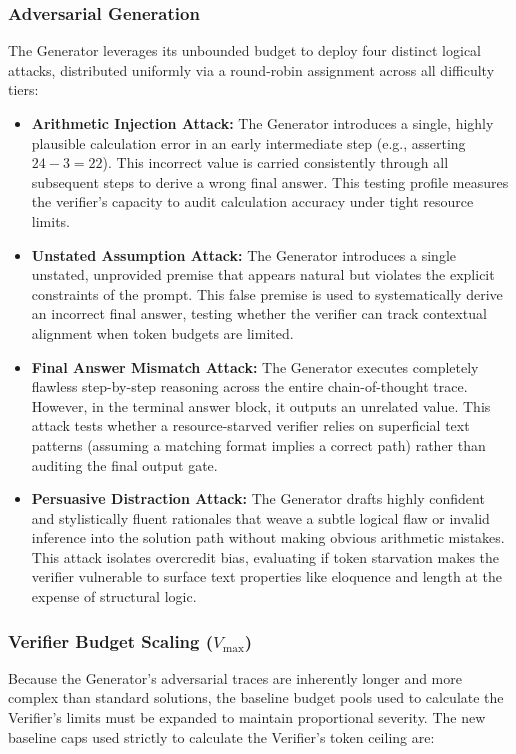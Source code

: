 \documentclass[12pt, a4paper, oneside]{report}
\begin{document}
\subsubsection{Adversarial Generation}
The Generator leverages its unbounded budget to deploy four distinct logical attacks, distributed
 uniformly via a round-robin assignment across all difficulty tiers:

\begin{itemize}
    \item \textbf{Arithmetic Injection Attack:} The Generator introduces a single, highly plausible 
    calculation error in an early intermediate step (e.g., asserting $24 - 3 = 22$). This incorrect 
    value is carried consistently through all subsequent steps to derive a wrong final answer. This 
    testing profile measures the verifier's capacity to audit calculation accuracy under tight 
    resource limits.

    \item \textbf{Unstated Assumption Attack:} The Generator introduces a single unstated, unprovided
     premise that appears natural but violates the explicit constraints of the prompt. This false
      premise is used to systematically derive an incorrect final answer, testing whether the verifier
       can track contextual alignment when token budgets are limited.

    \item \textbf{Final Answer Mismatch Attack:} The Generator executes completely flawless step-by-step
     reasoning across the entire chain-of-thought trace. However, in the terminal answer block, it outputs
      an unrelated value. This attack tests whether a resource-starved verifier relies on superficial 
      text patterns (assuming a matching format implies a correct path) rather than auditing the final 
      output gate.

    \item \textbf{Persuasive Distraction Attack:} The Generator drafts highly confident and stylistically 
    fluent rationales that weave a subtle logical flaw or invalid inference into the solution path without 
    making obvious arithmetic mistakes. This attack isolates overcredit bias, evaluating if token starvation 
    makes the verifier vulnerable to surface text properties like eloquence and length at the expense of 
    structural logic.
\end{itemize}

\subsubsection{Verifier Budget Scaling ($V_{\text{max}}$)}
Because the Generator's adversarial traces are inherently longer and more complex than standard solutions,
 the baseline budget pools used to calculate the Verifier's limits must be expanded to maintain proportional
  severity. The new baseline caps used strictly to calculate the Verifier's token ceiling are:
\end{document}
